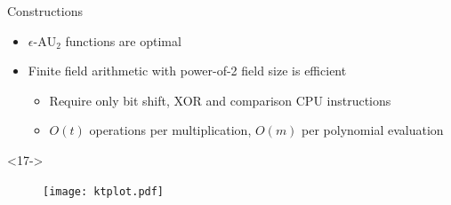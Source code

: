 \documentclass[xcolor=dvipsnames]{beamer}
\newcommand{\?}{\mathrel{?}} %
\newcommand{\frA}{\mathfrak{A}}
\newcommand{\frC}{\mathfrak{C}}
\newcommand{\AU}{\mathrm{AU}_{2}}
\newcommand{\eAU}{\epsilon\text{-}\AU}
\begin{document}
\begin{frame}{Constructions}
\begin{onlyenv}
\begin{itemize}[<+->]
      \item \(\eAU\) functions are optimal
      \item Finite field arithmetic with power-of-2 field size is efficient
        \begin{itemize}
          \item Require only bit shift, XOR and comparison CPU instructions
          \item \(O(t)\) operations per multiplication, \(O(m)\) per polynomial evaluation
        \end{itemize}
    \end{itemize}
  \end{onlyenv}
  \begin{onlyenv}<17->
    \begin{figure}
      \texttt{[image: ktplot.pdf]}
    \end{figure}
  \end{onlyenv}
\end{frame}

\newcommand{\insec}{\frC_{A \leftrightarrow B}}
\newcommand{\authkt}{\frA^{k+t}_{A \to B}}
\newcommand{\authm}{\frA^{m}_{A \to B}}
\newcommand{\Ei}{{\rm Ei}}
\end{document}

